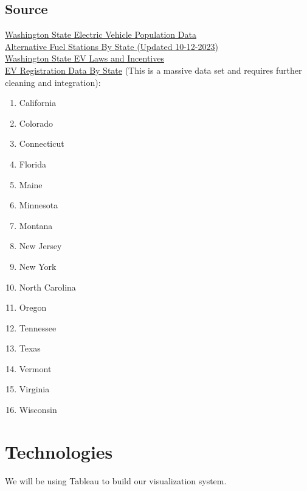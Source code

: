 \documentclass{article}
\begin{document}
\subsection*{Source}
\href{https://data.wa.gov/Transportation/Electric-Vehicle-Population-Data/f6w7-q2d2}{Washington State Electric Vehicle Population Data}\vspace*{5pt}\\
\href{https://afdc.energy.gov/data_download}{Alternative Fuel Stations By State (Updated 10-12-2023)}\vspace*{5pt}\\
\href{https://afdc.energy.gov/data_download}{Washington State EV Laws and Incentives}\vspace*{5pt}\\
\href{https://www.atlasevhub.com/materials/state-ev-registration-data/}{EV
Registration Data By State} (This is a massive data set and requires further
cleaning and integration):
\begin{multicols}{4}
    \begin{enumerate}[topsep=0pt, partopsep=0pt, itemsep=1pt, parsep=1pt]
        \item California
        \item Colorado
        \item Connecticut
        \item Florida
        \item Maine
        \item Minnesota
        \item Montana
        \item New Jersey
        \item New York
        \item North Carolina
        \item Oregon
        \item Tennessee
        \item Texas
        \item Vermont
        \item Virginia
        \item Wisconsin
    \end{enumerate}
\end{multicols}

\section*{Technologies}
We will be using Tableau to build our visualization system.
\end{document}
